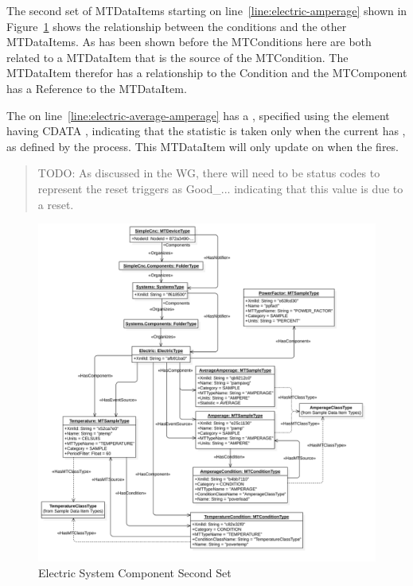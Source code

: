 The second set of \glspl{MTDataItem} starting on line~\ref{line:electric-amperage} shown in Figure~\ref{fig:electric-system-2} shows the relationship between the conditions and the other \glspl{MTDataItem}. As has been shown before the \glspl{MTCondition} here are both related to a \gls{MTDataItem} that is the source of the \gls{MTCondition}. The \gls{MTDataItem} therefor has a  relationship to the \gls{Condition} and the \gls{MTComponent} has a  \gls{Reference} to the \gls{MTDataItem}. 

The  on line~\ref{line:electric-average-amperage} has a , specified using the  element having \gls{CDATA} , indicating that the  statistic is taken only when the current  has , as defined by the process. This \gls{MTDataItem} will only update on when the  fires.

\begin{quote}
  {\color{red} TODO: As discussed in the WG, there will need to be status codes to represent the reset triggers as Good_... indicating that this value is due to a reset}.
\end{quote}

\begin{figure}[ht]
  \centering
  \includegraphics[width=1.0\textwidth]{diagrams/mtconnect-mapping/electric-system-2.png}
  \caption{Electric System Component Second Set}
  \label{fig:electric-system-2}
\end{figure}

